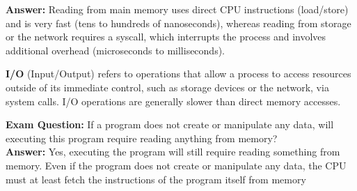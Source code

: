 \textbf{Answer:} Reading from main memory uses direct CPU instructions (load/store) and is very fast (tens to hundreds of nanoseconds), whereas reading from storage or the network requires a syscall, which interrupts the process and involves additional overhead (microseconds to milliseconds).
\vfill
\begin{definition}[I/O]
\textbf{I/O} (Input/Output) refers to operations that allow a process to access resources outside of its immediate control, such as storage devices or the network, via system calls. I/O operations are generally slower than direct memory accesses.
\end{definition}
\vspace{0.5em}
{\color{red}\textbf{Exam Question:} If a program does not create or manipulate any data, will executing this program require reading anything from memory?}\\[0.5em]
\textbf{Answer:} Yes, executing the program will still require reading something from memory. Even if the program does not create or manipulate any data, the CPU must at least fetch the instructions of the program itself from memory

\newpage
\vfill
